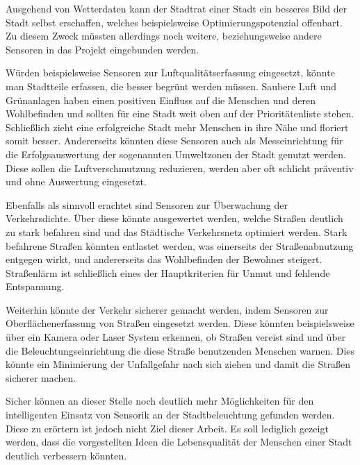 		Ausgehend von Wetterdaten kann der Stadtrat einer Stadt ein besseres Bild der Stadt selbst erschaffen, welches beispielsweise Optimierungspotenzial offenbart. Zu diesem Zweck müssten allerdings noch weitere, beziehungsweise andere Sensoren in das Projekt eingebunden werden.
		
		Würden beispielsweise Sensoren zur Luftqualitätserfassung eingesetzt, könnte man Stadtteile erfassen, die besser begrünt werden müssen. Saubere Luft und Grünanlagen haben einen positiven Einfluss auf die Menschen und deren Wohlbefinden und sollten für eine Stadt weit oben auf der Prioritätenliste stehen. Schließlich zieht eine erfolgreiche Stadt mehr Menschen in ihre Nähe und floriert somit besser. Andererseits könnten diese Sensoren auch als Messeinrichtung für die Erfolgsauswertung der sogenannten Umweltzonen der Stadt genutzt werden. Diese sollen die Luftverschmutzung reduzieren, werden aber oft schlicht präventiv und ohne Auswertung eingesetzt.
		
		Ebenfalls als sinnvoll erachtet sind Sensoren zur Überwachung der Verkehrsdichte. Über diese könnte ausgewertet werden, welche Straßen deutlich zu stark befahren sind und das Städtische Verkehrsnetz optimiert werden. Stark befahrene Straßen könnten entlastet werden, was einerseits der Straßenabnutzung entgegen wirkt, und andererseits das Wohlbefinden der Bewohner steigert. Straßenlärm ist schließlich eines der Hauptkriterien für Unmut und fehlende Entspannung. 
		
		Weiterhin könnte der Verkehr sicherer gemacht werden, indem Sensoren zur Oberflächenerfassung von Straßen eingesetzt werden. Diese könnten beispielsweise über ein Kamera oder Laser System erkennen, ob Straßen vereist sind und über die Beleuchtungseinrichtung die diese Straße benutzenden Menschen warnen. Dies könnte ein Minimierung der Unfallgefahr nach sich ziehen und damit die Straßen sicherer machen.
		
		Sicher können an dieser Stelle noch deutlich mehr Möglichkeiten für den intelligenten Einsatz von Sensorik an der Stadtbeleuchtung gefunden werden. Diese zu erörtern ist jedoch nicht Ziel dieser Arbeit. Es soll lediglich gezeigt werden, dass die vorgestellten Ideen die Lebensqualität der Menschen einer Stadt deutlich verbessern könnten.